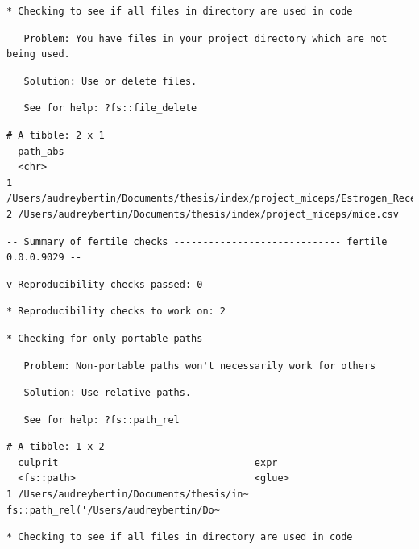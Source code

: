 \documentclass[12pt,twoside]{reedthesis}
\begin{document}
\begin{verbatim}
* Checking to see if all files in directory are used in code
\end{verbatim}
\begin{verbatim}
   Problem: You have files in your project directory which are not being used.
\end{verbatim}
\begin{verbatim}
   Solution: Use or delete files.
\end{verbatim}
\begin{verbatim}
   See for help: ?fs::file_delete
\end{verbatim}
\begin{verbatim}
# A tibble: 2 x 1
  path_abs                                                                      
  <chr>                                                                         
1 /Users/audreybertin/Documents/thesis/index/project_miceps/Estrogen_Receptors.~
2 /Users/audreybertin/Documents/thesis/index/project_miceps/mice.csv            
\end{verbatim}
\begin{verbatim}
-- Summary of fertile checks ----------------------------- fertile 0.0.0.9029 --
\end{verbatim}
\begin{verbatim}
v Reproducibility checks passed: 0
\end{verbatim}
\begin{verbatim}
* Reproducibility checks to work on: 2
\end{verbatim}
\begin{verbatim}
* Checking for only portable paths
\end{verbatim}
\begin{verbatim}
   Problem: Non-portable paths won't necessarily work for others
\end{verbatim}
\begin{verbatim}
   Solution: Use relative paths.
\end{verbatim}
\begin{verbatim}
   See for help: ?fs::path_rel
\end{verbatim}
\begin{verbatim}
# A tibble: 1 x 2
  culprit                                  expr                                 
  <fs::path>                               <glue>                               
1 /Users/audreybertin/Documents/thesis/in~ fs::path_rel('/Users/audreybertin/Do~
\end{verbatim}
\begin{verbatim}
* Checking to see if all files in directory are used in code
\end{verbatim}
\end{document}
